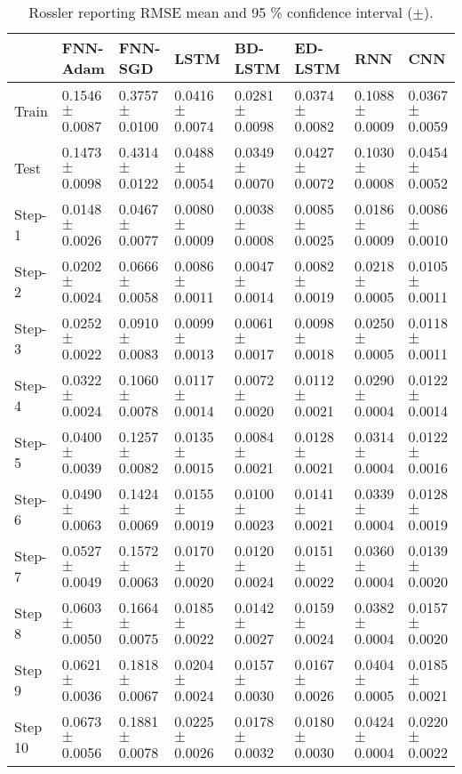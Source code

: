 \documentclass{ieeeaccess}
\begin{document}
\begin{table*}[htbp]
\smaller 
\caption{Rossler reporting RMSE mean and 95 \% confidence interval   ($\pm$).}
\label{tab:rossler}
\begin{tabular}{llllllll}
\hline
 &  FNN-Adam& FNN-SGD & LSTM & BD-LSTM  & ED-LSTM & RNN& CNN \\
\hline
\hline
		
Train &      
0.1546$\pm$	0.0087&
0.3757$\pm$	0.0100&
0.0416$\pm$	0.0074&
0.0281$\pm$	0.0098&
0.0374$\pm$	0.0082&
0.1088$\pm$	0.0009&0.0367$\pm$		0.0059\\
Test &      
0.1473$\pm$	0.0098&
0.4314$\pm$	0.0122&
0.0488$\pm$	0.0054&
0.0349$\pm$	0.0070&
0.0427$\pm$	0.0072&
0.1030$\pm$	0.0008&	0.0454$\pm$		0.0052\\
Step-1 &      
0.0148$\pm$	0.0026&
0.0467$\pm$	0.0077&
0.0080$\pm$	0.0009&
0.0038$\pm$	0.0008&
0.0085$\pm$	0.0025&
0.0186$\pm$	0.0009&	0.0086$\pm$		0.0010\\
Step-2 &      
0.0202$\pm$	0.0024&
0.0666$\pm$	0.0058&
0.0086$\pm$	0.0011&
0.0047$\pm$	0.0014&
0.0082$\pm$	0.0019&
0.0218$\pm$	0.0005&0.0105$\pm$		0.0011\\
Step-3 &      
0.0252$\pm$	0.0022&
0.0910$\pm$	0.0083&
0.0099$\pm$	0.0013&
0.0061$\pm$	0.0017&
0.0098$\pm$	0.0018&
0.0250$\pm$	0.0005&	0.0118$\pm$		0.0011\\
Step-4 &      
0.0322$\pm$	0.0024&
0.1060$\pm$	0.0078&
0.0117$\pm$	0.0014&
0.0072$\pm$	0.0020&
0.0112$\pm$	0.0021&
0.0290$\pm$	0.0004&	0.0122$\pm$		0.0014\\
Step-5 &      
0.0400$\pm$	0.0039&
0.1257$\pm$	0.0082&
0.0135$\pm$	0.0015&
0.0084$\pm$	0.0021&
0.0128$\pm$	0.0021&
0.0314$\pm$	0.0004&0.0122$\pm$		0.0016\\
Step-6 &      
0.0490$\pm$	0.0063&
0.1424$\pm$	0.0069&
0.0155$\pm$	0.0019&
0.0100$\pm$	0.0023&
0.0141$\pm$	0.0021&
0.0339$\pm$	0.0004&	0.0128$\pm$		0.0019\\
Step-7 &      
0.0527$\pm$	0.0049&
0.1572$\pm$	0.0063&
0.0170$\pm$	0.0020&
0.0120$\pm$	0.0024&
0.0151$\pm$	0.0022&
0.0360$\pm$	0.0004&	0.0139$\pm$		0.0020\\
Step 8 &      
0.0603$\pm$	0.0050&
0.1664$\pm$	0.0075&
0.0185$\pm$	0.0022&
0.0142$\pm$	0.0027&
0.0159$\pm$	0.0024&
0.0382$\pm$	0.0004&	0.0157$\pm$		0.0020\\
Step 9 &      
0.0621$\pm$	0.0036&
0.1818$\pm$	0.0067&
0.0204$\pm$	0.0024&
0.0157$\pm$	0.0030&
0.0167$\pm$	0.0026&
0.0404$\pm$	0.0005&	0.0185$\pm$		0.0021\\
Step 10 &      
0.0673$\pm$	0.0056&
0.1881$\pm$	0.0078&
0.0225$\pm$	0.0026&
0.0178$\pm$	0.0032&
0.0180$\pm$	0.0030&
0.0424$\pm$	0.0004&	0.0220$\pm$		0.0022\\
\hline
 
\end{tabular}

\end{table*}
\end{document}
